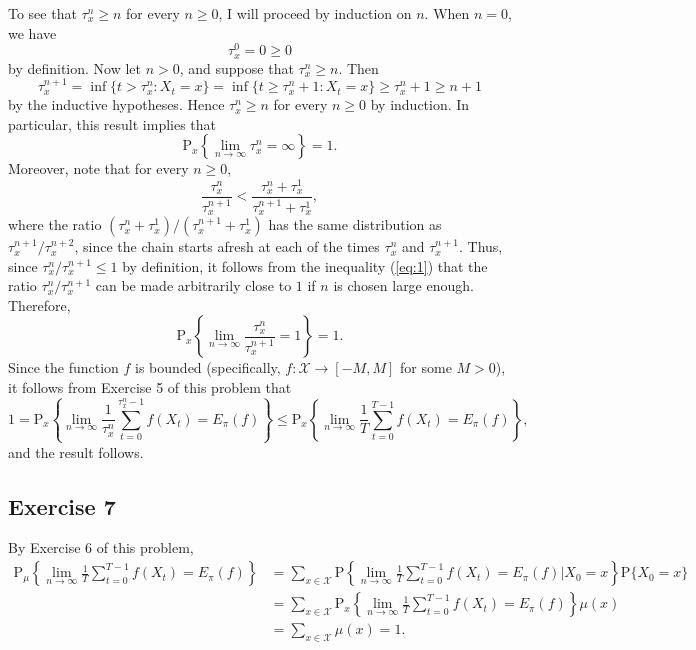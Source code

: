 \documentclass[12pt]{article}
\newcommand{\Prob}{\mathrm{P}}
\begin{document}
To see that $\tau_x^n \geq n$ for every $n \geq 0$, I will proceed by induction on $n$. When $n = 0$, we have
\begin{equation*}
\tau_x^0 = 0 \geq 0
\end{equation*}
by definition. Now let $n > 0$, and suppose that $\tau_x^n \geq n$. Then
\begin{equation*}
\tau_x^{n+1} = \inf\{t > \tau_x^n : X_t = x\} = \inf\{t \geq \tau_x^n + 1 : X_t = x\} \geq \tau_x^n + 1 \geq n + 1
\end{equation*}
by the inductive hypotheses. Hence $\tau_x^n \geq n$ for every $n \geq 0$ by induction. In particular, this result implies that
\begin{equation*}
\Prob_x\left\{\lim_{n \to \infty} \tau_x^n = \infty\right\} = 1.
\end{equation*}
Moreover, note that for every $n \geq 0$,
\begin{equation} \label{eq:1}
\frac{\tau_x^n}{\tau_x^{n+1}} < \frac{\tau_x^n + \tau_x^1}{\tau_x^{n+1} + \tau_x^1},
\end{equation}
where the ratio $(\tau_x^n + \tau_x^1) / (\tau_x^{n+1} + \tau_x^1)$ has the same distribution as $\tau_x^{n+1} / \tau_x^{n+2}$, since the chain starts afresh at each of the times $\tau_x^n$ and $\tau_x^{n+1}$. Thus, since $\tau_x^n / \tau_x^{n+1} \leq 1$ by definition, it follows from the inequality (\ref{eq:1}) that the ratio $\tau_x^n / \tau_x^{n+1}$ can be made arbitrarily close to $1$ if $n$ is chosen large enough. Therefore,
\begin{equation*}
\Prob_x\left\{\lim_{n \to \infty} \frac{\tau_x^n}{\tau_x^{n+1}} = 1 \right\} = 1.
\end{equation*}
Since the function $f$ is bounded (specifically, $f : \mathcal{X} \to [-M, M]$ for some $M > 0$), it follows from Exercise 5 of this problem that
\begin{equation*}
1 = \Prob_x\left\{\lim_{n \to \infty} \frac{1}{\tau_x^n} \sum_{t=0}^{\tau_x^n - 1} f(X_t) = E_\pi(f) \right\} \leq \Prob_x\left\{\lim_{n \to \infty} \frac{1}{T} \sum_{t=0}^{T-1} f(X_t) = E_\pi(f) \right\},
\end{equation*}
and the result follows.

\subsection*{Exercise 7}

By Exercise 6 of this problem,
\begin{align*}
\Prob_\mu\left\{\lim_{n \to \infty} \frac{1}{T} \sum_{t=0}^{T-1} f(X_t) = E_\pi(f) \right\} &= \sum_{x \in \mathcal{X}} \Prob\left\{\lim_{n \to \infty} \frac{1}{T} \sum_{t=0}^{T-1} f(X_t) = E_\pi(f) \bigg| X_0 = x\right\} \Prob\{X_0 = x\} \\
&= \sum_{x \in \mathcal{X}} \Prob_x\left\{\lim_{n \to \infty} \frac{1}{T} \sum_{t=0}^{T-1} f(X_t) = E_\pi(f) \right\} \mu(x) \\
&= \sum_{x \in \mathcal{X}} \mu(x) = 1.
\end{align*}
\end{document}
